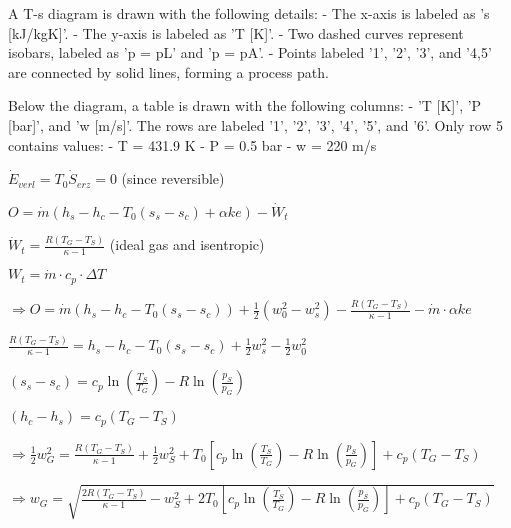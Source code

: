 A T-s diagram is drawn with the following details:  
- The x-axis is labeled as 's [kJ/kgK]'.  
- The y-axis is labeled as 'T [K]'.  
- Two dashed curves represent isobars, labeled as 'p = pL' and 'p = pA'.  
- Points labeled '1', '2', '3', and '4,5' are connected by solid lines, forming a process path.  

Below the diagram, a table is drawn with the following columns:  
- 'T [K]', 'P [bar]', and 'w [m/s]'.  
The rows are labeled '1', '2', '3', '4', '5', and '6'.  
Only row 5 contains values:  
- T = 431.9 K  
- P = 0.5 bar  
- w = 220 m/s

\( \dot{E}_{verl} = T_0 \dot{S}_{erz} = 0 \) (since reversible)  

\( O = \dot{m} (h_s - h_c - T_0 (s_s - s_c) + \alpha k e) - \dot{W}_t \)  

\( \dot{W}_t = \frac{R (T_G - T_S)}{\kappa - 1} \) (ideal gas and isentropic)  

\( W_t = \dot{m} \cdot c_p \cdot \Delta T \)  

\( \Rightarrow O = \dot{m} (h_s - h_c - T_0 (s_s - s_c)) + \frac{1}{2} (w_0^2 - w_s^2) - \frac{R (T_G - T_S)}{\kappa - 1} - \dot{m} \cdot \alpha k e \)  

\( \frac{R (T_G - T_S)}{\kappa - 1} = h_s - h_c - T_0 (s_s - s_c) + \frac{1}{2} w_s^2 - \frac{1}{2} w_0^2 \)  

\( (s_s - s_c) = c_p \ln \left( \frac{T_S}{T_G} \right) - R \ln \left( \frac{p_S}{p_G} \right) \)  

\( (h_c - h_s) = c_p (T_G - T_S) \)  

\( \Rightarrow \frac{1}{2} w_G^2 = \frac{R (T_G - T_S)}{\kappa - 1} + \frac{1}{2} w_S^2 + T_0 \left[ c_p \ln \left( \frac{T_S}{T_G} \right) - R \ln \left( \frac{p_S}{p_G} \right) \right] + c_p (T_G - T_S) \)  

\( \Rightarrow w_G = \sqrt{\frac{2 R (T_G - T_S)}{\kappa - 1} - w_S^2 + 2 T_0 \left[ c_p \ln \left( \frac{T_S}{T_G} \right) - R \ln \left( \frac{p_S}{p_G} \right) \right] + c_p (T_G - T_S)} \)